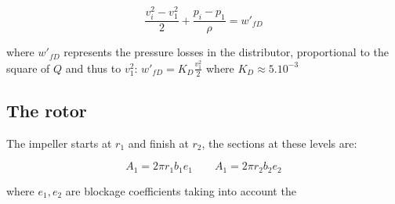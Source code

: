 \begin{equation}
\frac{v_i^2-v_1^2}{2} + \frac{p_i-p_1}{\rho} = w'_{fD}
\end{equation}

where $w'_{fD}$ represents the pressure losses in the distributor, proportional to the square of $Q$ and thus to $v_1^2$: $w'_{fD}= K_D \frac{v^2_1}{2}$ where $K_D \approx 5.10^{-3}$

\subsection{The rotor}
The impeller starts at $r_1$ and finish at $r_2$, the sections at these levels are: 

\begin{equation}
A_1 = 2\pi r_1b_1 e_1 \qquad A_1 = 2\pi r_2b_2 e_2
\end{equation}

where $e_1,e_2$ are blockage coefficients taking into account the  